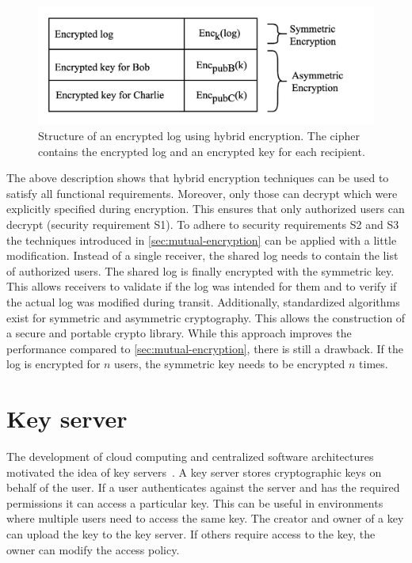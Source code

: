 \documentclass[../main.tex]{subfiles}
\begin{document}
\begin{figure}[ht]
    \includegraphics[scale=0.22]{../img/04/hybrid_encryption.jpg}
    \centering
    \caption[Structure encrypted log]{Structure of an encrypted log using hybrid encryption. The cipher contains the encrypted log and an encrypted key for each recipient.}
    \label{fig:hybrid_encryption}
\end{figure}

The above description shows that hybrid encryption techniques can be used to satisfy all functional requirements.
Moreover, only those can decrypt which were explicitly specified during encryption.
This ensures that only authorized users can decrypt (security requirement S1).
To adhere to security requirements S2 and S3 the techniques introduced in \cref{sec:mutual-encryption} can be applied with a little modification.
Instead of a single receiver, the shared log needs to contain the list of authorized users.
The shared log is finally encrypted with the symmetric key.
This allows receivers to validate if the log was intended for them and to verify if the actual log was modified during transit.
Additionally, standardized algorithms exist for symmetric and asymmetric cryptography.
This allows the construction of a secure and portable crypto library.
While this approach improves the performance compared to \cref{sec:mutual-encryption}, there is still a drawback.
If the log is encrypted for $n$ users, the symmetric key needs to be encrypted $n$ times.

\section{Key server}
\label{sec:key-server}

The development of cloud computing and centralized software architectures motivated the idea of key servers~\cite{Seitz2003}.
A key server stores cryptographic keys on behalf of the user.
If a user authenticates against the server and has the required permissions it can access a particular key.
This can be useful in environments where multiple users need to access the same key.
The creator and owner of a key can upload the key to the key server.
If others require access to the key, the owner can modify the access policy.
\end{document}
